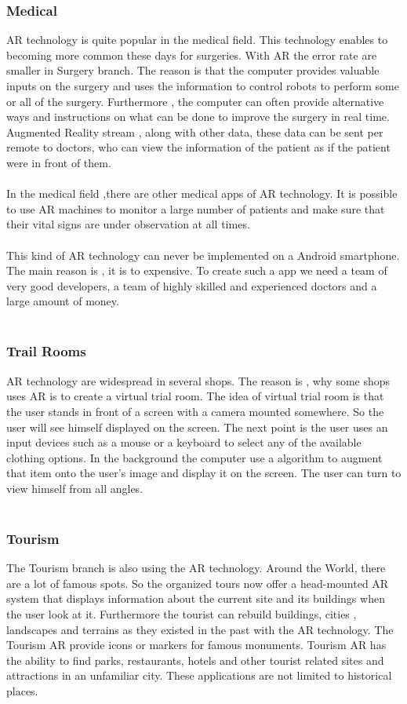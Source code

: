 \subsubsection{Medical}
AR technology is quite popular in the medical field.  This technology enables to becoming more common these days for surgeries.  With AR the error rate are smaller in Surgery branch. The reason is that the computer provides valuable inputs on the surgery and uses the information to control robots to perform some or all of the surgery.  Furthermore , the computer  can often provide alternative ways and instructions  on what can be done to improve the  surgery in real time.   Augmented Reality  stream , along with other data, these data can be sent per remote to doctors, who can view the information of the patient as  if the patient were in front of them.
\\
\\
In the medical field ,there are other medical apps of AR technology.  It is possible to use AR machines to monitor a large number of patients and make sure that their vital signs are under observation at all times.
\\
\\
This kind of AR technology can never be implemented on a Android smartphone. The main reason is , it is to expensive.  To create such a app we need a team of very good developers, a team of highly skilled and experienced doctors and a large amount of money.
\\
\\
\subsubsection{Trail Rooms}
AR technology are widespread in several shops. The reason is , why some shops uses AR is to create a virtual trial room.  The idea of virtual trial room is  that the user stands in front of a screen with a camera mounted somewhere.  So the user will see himself displayed on the screen. The next point is the user uses an input devices such as a mouse or a keyboard to select any of the available clothing options. In the background the computer use a algorithm to augment that item onto the user’s image and display it on the screen.  The  user can turn to view himself from all angles. 
\\
\\
\subsubsection{Tourism}
The Tourism branch is also using the AR technology.  Around the World, there are a lot of famous spots. So the organized tours now offer a head-mounted AR system that displays information about the current site and its buildings when the user look at it.  Furthermore the tourist can rebuild buildings, cities , landscapes and terrains as they existed in the past with the AR technology. The Tourism AR provide icons or markers for famous monuments. Tourism AR has the ability to find parks, restaurants, hotels and other tourist related sites and attractions in an unfamiliar city. These applications are not limited to historical places. 
\\
\\
